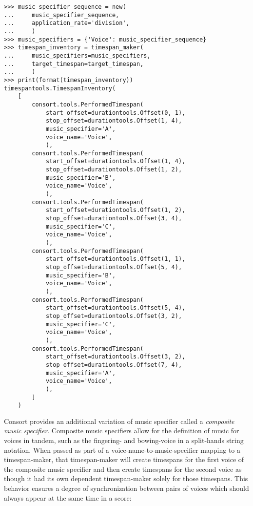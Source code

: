 \begin{abjadbookoutput}
\begin{singlespacing}
\vspace{-0.5\baselineskip}
\begin{lstlisting}
>>> music_specifier_sequence = new(
...     music_specifier_sequence,
...     application_rate='division',
...     )
>>> music_specifiers = {'Voice': music_specifier_sequence}
>>> timespan_inventory = timespan_maker(
...     music_specifiers=music_specifiers,
...     target_timespan=target_timespan,
...     )
>>> print(format(timespan_inventory))
timespantools.TimespanInventory(
    [
        consort.tools.PerformedTimespan(
            start_offset=durationtools.Offset(0, 1),
            stop_offset=durationtools.Offset(1, 4),
            music_specifier='A',
            voice_name='Voice',
            ),
        consort.tools.PerformedTimespan(
            start_offset=durationtools.Offset(1, 4),
            stop_offset=durationtools.Offset(1, 2),
            music_specifier='B',
            voice_name='Voice',
            ),
        consort.tools.PerformedTimespan(
            start_offset=durationtools.Offset(1, 2),
            stop_offset=durationtools.Offset(3, 4),
            music_specifier='C',
            voice_name='Voice',
            ),
        consort.tools.PerformedTimespan(
            start_offset=durationtools.Offset(1, 1),
            stop_offset=durationtools.Offset(5, 4),
            music_specifier='B',
            voice_name='Voice',
            ),
        consort.tools.PerformedTimespan(
            start_offset=durationtools.Offset(5, 4),
            stop_offset=durationtools.Offset(3, 2),
            music_specifier='C',
            voice_name='Voice',
            ),
        consort.tools.PerformedTimespan(
            start_offset=durationtools.Offset(3, 2),
            stop_offset=durationtools.Offset(7, 4),
            music_specifier='A',
            voice_name='Voice',
            ),
        ]
    )
\end{lstlisting}
\end{singlespacing}
\end{abjadbookoutput}

\noindent Consort provides an additional variation of music specifier called a
\emph{composite music specifier}.
Composite music specifiers allow for the definition of music for voices in
tandem, such as the fingering- and bowing-voice in a split-hands string
notation. When passed as part of a voice-name-to-music-specifier mapping to a
timespan-maker, that timespan-maker will create timespans for the first voice
of the composite music specifier and then create timespans for the second voice
as though it had its own dependent timespan-maker solely for those timespans.
This behavior ensures a degree of synchronization between pairs of voices which
should always appear at the same time in a score:

